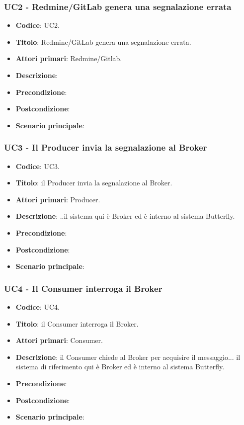 \subsubsection{UC2 - Redmine/GitLab genera una segnalazione errata}
	\begin{itemize}
		\item \textbf{Codice}: UC2.
		\item \textbf{Titolo}: Redmine/GitLab genera una segnalazione errata.
		\item \textbf{Attori primari}: Redmine/Gitlab.
		\item \textbf{Descrizione}:
		\item \textbf{Precondizione}:
		\item \textbf{Postcondizione}:
		\item \textbf{Scenario principale}: 
	\end{itemize}

\subsubsection{UC3 - Il Producer invia la segnalazione al Broker}
	\begin{itemize}
		\item \textbf{Codice}: UC3.
		\item \textbf{Titolo}: il Producer invia la segnalazione al Broker.
		\item \textbf{Attori primari}: Producer.
		\item \textbf{Descrizione}: ..il sistema qui è Broker ed è interno al sistema Butterfly.
		\item \textbf{Precondizione}:
		\item \textbf{Postcondizione}:
		\item \textbf{Scenario principale}: 
	\end{itemize}


\subsubsection{UC4 - Il Consumer interroga il Broker}
	\begin{itemize}
		\item \textbf{Codice}: UC4.
		\item \textbf{Titolo}: il Consumer interroga il Broker.
		\item \textbf{Attori primari}: Consumer.
		\item \textbf{Descrizione}: il Consumer chiede al Broker per acquisire il messaggio... il sistema di riferimento qui è Broker ed è interno al sistema Butterfly.
		\item \textbf{Precondizione}:
		\item \textbf{Postcondizione}:
		\item \textbf{Scenario principale}: 
	\end{itemize}

